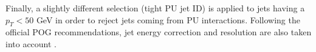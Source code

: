 \documentclass[a4paper, 10pt, openright]{report}
\begin{document}
%

Finally, a slightly different selection (tight \ac{PU} jet ID) is applied to jets having a $p_T < 50$ GeV in order to reject jets coming from \ac{PU} interactions. Following the official \ac{POG} recommendations, jet energy correction and resolution are also taken into account \cite{JEC2, JER}.
\end{document}
